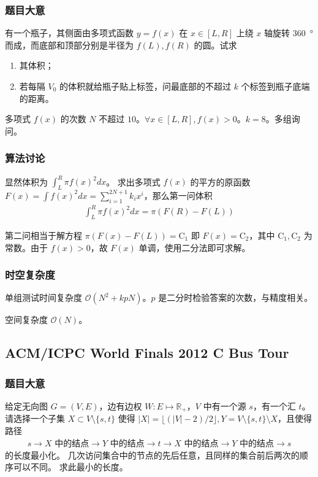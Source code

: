 			\subsubsection{题目大意}
				有一个瓶子，其侧面由多项式函数 $y=f(x)$ 在 $x \in \left[L,R\right]$ 上绕 $x$ 轴旋转 \SI{360}{\degree} 而成，而底部和顶部分别是半径为 $f(L), f(R)$ 的圆。试求
				\begin{enumerate}
					\item 其体积；
					\item 若每隔 $V_0$ 的体积就给瓶子贴上标签，问最底部的不超过 $k$ 个标签到瓶子底端的距离。
				\end{enumerate}
				
				多项式 $f(x)$ 的次数 $N$ 不超过 $10$。$\forall x \in \left[L,R\right], f(x) > 0$。$k = 8$。多组询问。
			\subsubsection{算法讨论}
				显然体积为 $\int_{L}^{R} \pi f(x)^2 dx$。 求出多项式 $f(x)$ 的平方的原函数 $F(x) = \int f(x)^2 dx = \sum_{i=1}^{2N+1} k_ix^i$，那么第一问体积
				\begin{align}
					\int_{L}^{R} \pi f(x)^2 dx = \pi \left(F(R) - F(L)\right)
				\end{align}
				
				第二问相当于解方程 $\pi \left(F(x) - F(L)\right) = \mathrm{C}_1$ 即 $F(x) = \mathrm{C}_2$，其中 $\mathrm{C}_1,\mathrm{C}_2$ 为常数。由于 $f(x)>0$，故 $F(x)$ 单调，使用二分法即可求解。
			\subsubsection{时空复杂度}
				单组测试时间复杂度 $\mathcal{O}\left(N^2 + k p N\right)$。$p$ 是二分时检验答案的次数，与精度相关。
					
				空间复杂度 $\mathcal{O}\left(N\right)$。
		\newpage
		\subsection{ACM/ICPC World Finals 2012 C Bus Tour}
			\subsubsection{题目大意}
				给定无向图 $G =(V,E)$，边有边权 $W :　E \mapsto \mathbb{R}_+$，$V$ 中有一个源 $s$，有一个汇 $t$。请选择一个子集 $X \subset V \setminus \{ s,t\}$ 使得 $|X| = \lfloor (|V|-2)/2 \rfloor, Y = V \setminus \{ s,t\} \setminus X$，且使得路径 
				\begin{align}
					s \rightarrow X  \text{ 中的结点} \rightarrow Y \text{  中的结点} \rightarrow t \rightarrow X \text{ 中的结点}
				 \rightarrow Y \text{ 中的结点}   \rightarrow s  \label{2012cpath}
				\end{align} 的长度最小化。
				几次访问集合中的节点的先后任意，且同样的集合前后两次的顺序可以不同。 求此最小的长度。
			
